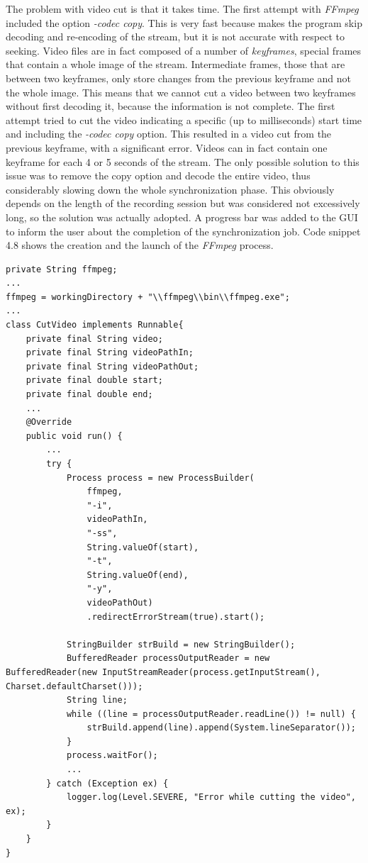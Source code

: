 \documentclass[binding=0.6cm,LaM]{sapthesis}
\begin{document}
The problem with video cut is that it takes time. The first attempt with \textit{FFmpeg} included the option \textit{-codec copy}. This is very fast because makes the program skip decoding and re-encoding of the stream, but it is not accurate with respect to seeking. Video files are in fact composed of a number of \textit{keyframes}, special frames that contain a whole image of the stream. Intermediate frames, those that are between two keyframes, only store changes from the previous keyframe and not the whole image. This means that we cannot cut a video between two keyframes without first decoding it, because the information is not complete. The first attempt tried to cut the video indicating a specific (up to milliseconds) start time and including the \textit{-codec copy} option. This resulted in a video cut from the previous keyframe, with a significant error. Videos can in fact contain one keyframe for each 4 or 5 seconds of the stream. The only possible solution to this issue was to remove the copy option and decode the entire video, thus considerably slowing down the whole synchronization phase. This obviously depends on the length of the recording session but was considered not excessively long, so the solution was actually adopted.
A progress bar was added to the GUI to inform the user about the completion of the synchronization job. Code snippet 4.8 shows the creation and the launch of the \textit{FFmpeg} process.
\\
\begin{lstlisting}[caption={Cut video process}, captionpos=b]
private String ffmpeg;
...
ffmpeg = workingDirectory + "\\ffmpeg\\bin\\ffmpeg.exe";
...
class CutVideo implements Runnable{
	private final String video;
	private final String videoPathIn;
	private final String videoPathOut;
	private final double start;
	private final double end;
	...  
	@Override
	public void run() {
		...
		try {
 			Process process = new ProcessBuilder(
				ffmpeg,
				"-i",
				videoPathIn,
				"-ss",
				String.valueOf(start),
				"-t",
				String.valueOf(end),
				"-y",
				videoPathOut)
				.redirectErrorStream(true).start();

			StringBuilder strBuild = new StringBuilder();
			BufferedReader processOutputReader = new BufferedReader(new InputStreamReader(process.getInputStream(), Charset.defaultCharset()));
			String line;
			while ((line = processOutputReader.readLine()) != null) {
				strBuild.append(line).append(System.lineSeparator());
			}
			process.waitFor();
			...
		} catch (Exception ex) {
			logger.log(Level.SEVERE, "Error while cutting the video", ex);
		}
	}
}
\end{lstlisting}
\end{document}
